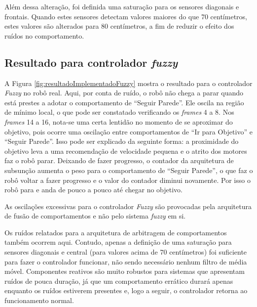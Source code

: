 	Além dessa alteração, foi definida uma saturação para os sensores diagonais e frontais. Quando estes sensores
	detectam valores maiores do que 70 centímetros, estes valores são alterados para 80 centímetros, a fim de
	reduzir o efeito dos ruídos no comportamento.  
	
	\subsection{Resultado para controlador \textit{fuzzy}}

	A Figura \ref{fig:resultadoImplementadoFuzzy} mostra o resultado para o controlador \textit{Fuzzy} no robô 
	real. Aqui, por conta de ruído, o robô não chega a parar quando está prestes a adotar o comportamento de 
	``Seguir Parede''. Ele oscila na região de mínimo local, o que pode ser constatado verificando os 
	\textit{frames} 4 a 8. Nos \textit{frames} 14 a 16, nota-se uma certa lentidão no momento de se aproximar do
	objetivo, pois ocorre uma oscilação entre comportamentos de ``Ir para Objetivo'' e ``Seguir Parede''. Isso 
	pode ser explicado da seguinte forma: a proximidade do objetivo leva a uma recomendação de velocidade pequena e
	o atrito dos motores faz o robô parar. Deixando de fazer progresso, o contador da arquitetura de subsunção 
	aumenta o peso para o comportamento de ``Seguir Parede'', o que faz o robô voltar a fazer progresso e o 
	valor do contador diminui novamente. Por isso o robô para e anda de pouco a pouco até chegar no objetivo.
	
	
	
	As oscilações excessivas para o controlador \textit{Fuzzy} são provocadas pela arquitetura de fusão de 
	comportamentos e não pelo sistema \textit{fuzzy} em si.
	
	Os ruídos relatados para a arquitetura de arbitragem de comportamentos também ocorrem aqui. Contudo, apenas 
	a definição de uma saturação para sensores diagonais e central (para valores acima de 70 centímetros) foi 
	suficiente para fazer o controlador funcionar, não sendo necessário nenhum filtro de média móvel. Componentes 
	reativos são muito robustos para sistemas que apresentam ruídos de pouca duração, já que um comportamento 
	errático durará apenas enquanto os ruídos estiverem presentes e, logo a seguir, o controlador retorna ao 
	funcionamento normal.
	
%
